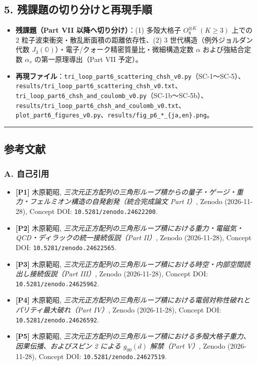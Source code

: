 \documentclass[
  a4paper,
]{ltjsarticle}
\providecommand{\tightlist}{%
  \setlength{\itemsep}{0pt}\setlength{\parskip}{0pt}}
\begin{document}
\subsection{5.
残課題の切り分けと再現手順}\label{ux6b8bux8ab2ux984cux306eux5207ux308aux5206ux3051ux3068ux518dux73feux624bux9806}

\begin{itemize}
\tightlist
\item
  \textbf{残課題（Part VII 以降へ切り分け）}：(1) 多殻大格子
  \(O_8^{\otimes K}\;(K\ge 3)\) 上での 2
  粒子波束衝突・散乱断面積の距離依存性、(2) 3
  世代構造（例外ジョルダン代数
  \(J_3(\mathbb{O})\)）・電子/クォーク精密質量比・微細構造定数
  \(\alpha\) および強結合定数 \(\alpha_s\) の第一原理導出（Part VII
  予定）。
\item
  \textbf{再現ファイル}：\texttt{tri\_loop\_part6\_scattering\_chsh\_v0.py}（SC-1〜SC-5）、\texttt{results/tri\_loop\_part6\_scattering\_chsh\_v0.txt}、\texttt{tri\_loop\_part6\_chsh\_and\_coulomb\_v0.py}（SC-1b〜SC-5b）、\texttt{results/tri\_loop\_part6\_chsh\_and\_coulomb\_v0.txt}、\texttt{plot\_part6\_figures\_v0.py}、\texttt{results/fig\_p6\_*\_\{ja,en\}.png}。
\end{itemize}

\begin{center}\rule{0.5\linewidth}{0.5pt}\end{center}

\subsection{参考文献}\label{ux53c2ux8003ux6587ux732e}

\subsubsection{A. 自己引用}\label{a.-ux81eaux5df1ux5f15ux7528}

\begin{itemize}
\tightlist
\item
  \textbf{{[}P1{]}} 木原範昭,
  \emph{三次元正方配列の三角形ループ積からの量子・ゲージ・重力・フェルミオン構造の自発創発（統合完成論文
  Part I）}, Zenodo (2026-11-28), Concept DOI:
  \texttt{10.5281/zenodo.24622200}.
\item
  \textbf{{[}P2{]}} 木原範昭,
  \emph{三次元正方配列の三角形ループ積における重力・電磁気・QCD・ディラックの統一接続仮説（Part
  II）}, Zenodo (2026-11-28), Concept DOI:
  \texttt{10.5281/zenodo.24622565}.
\item
  \textbf{{[}P3{]}} 木原範昭,
  \emph{三次元正方配列の三角形ループ積における時空・内部空間読出し接続仮説（Part
  III）}, Zenodo (2026-11-28), Concept DOI:
  \texttt{10.5281/zenodo.24625962}.
\item
  \textbf{{[}P4{]}} 木原範昭,
  \emph{三次元正方配列の三角形ループ積における電弱対称性破れとパリティ最大破れ（Part
  IV）}, Zenodo (2026-11-28), Concept DOI:
  \texttt{10.5281/zenodo.24626592}.
\item
  \textbf{{[}P5{]}} 木原範昭,
  \emph{三次元正方配列の三角形ループ積における多殻大格子重力、因果伝播、およびスピン
  2 による \(g_{00}(d)\) 解禁（Part V）}, Zenodo (2026-11-28), Concept
  DOI: \texttt{10.5281/zenodo.24627519}.
\end{itemize}
\end{document}
